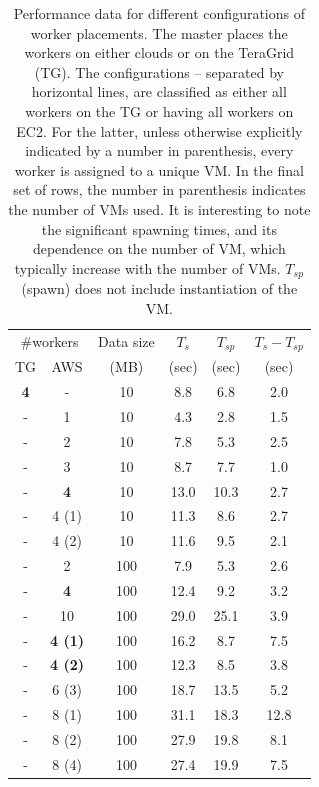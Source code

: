 \documentclass[3p,twocolumn]{elsarticle}
\begin{document}
\begin{table}
  \upp
  \footnotesize
  \begin{tabular}{cccccc}
    \hline
    \multicolumn{2}{c}{\#workers}  &  Data size   &  $T_s$  & $T_{sp}$ & $T_s - T_{sp}$\\   
    TG &  AWS &   (MB)  & (sec) & (sec)  & (sec) \\
    \hline
    { {\bf 4}} & - & 10  &  8.8 &  6.8 & 2.0 \\
    \hline 
    - & 1 & 10 & 4.3 & 2.8 & 1.5 \\
    - & 2 & 10 & 7.8 & 5.3 & 2.5 \\ 
    - & 3 & 10 & 8.7 & 7.7 & 1.0 \\
    - & {\bf 4} & 10 & 13.0 & 10.3 & 2.7 \\
    - & 4 (1) & 10 & 11.3 & 8.6 & 2.7 \\
    - & 4 (2) & 10 & 11.6 & 9.5 & 2.1 \\
    \hline 
    -  & 2  & 100 & 7.9  & 5.3 & 2.6 \\
    -  & {\bf 4}  & 100 & 12.4 & 9.2 & 3.2\\
    -  & 10 & 100 & 29.0 & 25.1 & 3.9 \\
    \hline
    - & {\bf 4 (1)} & 100 & 16.2 & 8.7 & 7.5 \\ 
    - & {\bf 4 (2)} & 100 & 12.3 & 8.5 & 3.8 \\
    - & 6 (3) & 100 & 18.7 & 13.5 & 5.2\\
    - & 8 (1) & 100 & 31.1 & 18.3 & 12.8 \\
    - & 8 (2) & 100 & 27.9 & 19.8 & 8.1\\
    - & 8 (4) & 100 & 27.4 & 19.9 & 7.5\\
    \hline \hline
  \end{tabular}
  \caption{Performance data for different configurations of worker
  placements. The master places the workers on either clouds or on the
  TeraGrid (TG). The configurations -- separated by horizontal lines,
  are classified as either all workers on the TG or having all workers
  on EC2. For the latter, unless otherwise explicitly indicated by a
  number in parenthesis, every worker is assigned to a unique VM. In
  the final set of rows, the number  in parenthesis indicates the
  number of VMs used. It is interesting to note the significant
  spawning times, and its dependence on the number of VM, which
  typically increase with the number of VMs. $T_{sp}$ (spawn) does not
  include instantiation of the VM.
  \label{stuff-1}}

  
\end{table}
\end{document}
